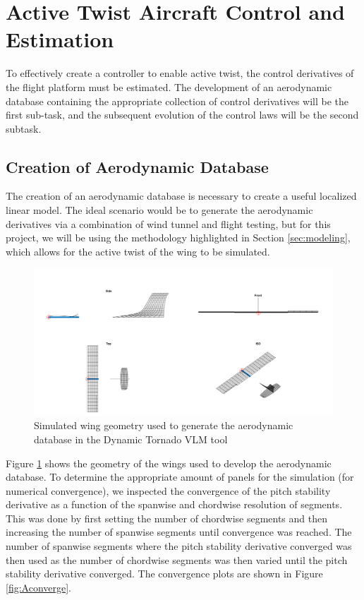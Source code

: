 \documentclass[11pt]{ucthesis}
\begin{document}
\section{Active Twist Aircraft Control and Estimation}
To effectively create a controller to enable active twist, the control derivatives of the flight platform must be estimated. The development of an aerodynamic database containing the appropriate collection of control derivatives will be the first sub-task, and the subsequent evolution of the control laws will be the second subtask.

\subsection{Creation of Aerodynamic Database}
The creation of an aerodynamic database is necessary to create a useful localized linear model. The ideal scenario would be to generate the aerodynamic derivatives via a combination of wind tunnel and flight testing, but for this project, we will be using the methodology highlighted in Section \ref{sec:modeling}, which allows for the active twist of the wing to be simulated.

\begin{figure}[thpb]
\centering
\includegraphics[width=.8\linewidth]{Figures/SimulationMultiAngleView.png}
\caption{Simulated wing geometry used to generate the aerodynamic database in the Dynamic Tornado VLM tool}
\label{fig:AmultiAngle}
\end{figure}

Figure \ref{fig:AmultiAngle} shows the geometry of the wings used to develop the aerodynamic database. To determine the appropriate amount of panels for the simulation (for numerical convergence), we inspected the convergence of the pitch stability derivative as a function of the spanwise and chordwise resolution of segments. This was done by first setting the number of chordwise segments and then increasing the number of spanwise segments until convergence was reached. The number of spanwise segments where the pitch stability derivative converged was then used as the number of chordwise segments was then varied until the pitch stability derivative converged. The convergence plots are shown in Figure \ref{fig:Aconverge}. 
\end{document}
